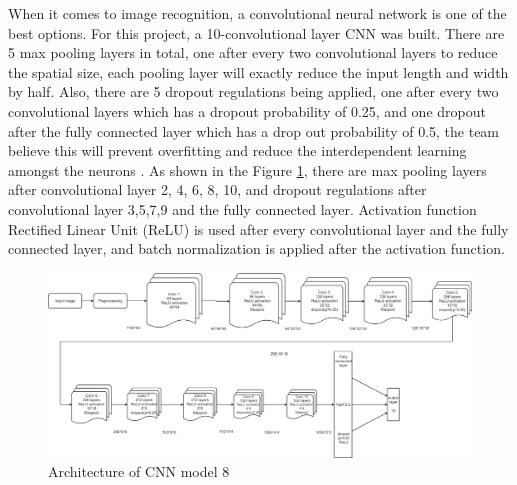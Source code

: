 \documentclass[letterpaper, 10 pt, conference]{ieeeconf}  %
\begin{document}
When it comes to image recognition, a convolutional neural network is one of the best options. For this project, a 10-convolutional layer CNN was built. There are 5 max pooling layers in total, one after every two convolutional layers to reduce the spatial size, each pooling layer will exactly reduce the input length and width by half. Also, there are 5 dropout regulations being applied, one after every two convolutional layers which has a dropout probability of 0.25, and one dropout after the fully connected layer which has a drop out probability of 0.5, the team believe this will prevent overfitting and reduce the interdependent learning amongst the neurons \cite{Budhiraja2016}. As shown in the Figure \ref{fig:CNNarch}, there are max pooling layers after convolutional layer 2, 4, 6, 8, 10, and dropout regulations after convolutional layer 3,5,7,9 and the fully connected layer. Activation function Rectified Linear Unit (ReLU) is used after every convolutional layer and the fully connected layer, and batch normalization is applied after the activation function.
\begin{figure}[t]
	\begin{center}
		\includegraphics[width=1\textwidth]{figures/CNNflowchart.png}  %
		\caption{Architecture of CNN model 8}
		\label{fig:CNNarch}
	\end{center}
\end{figure}
\end{document}
